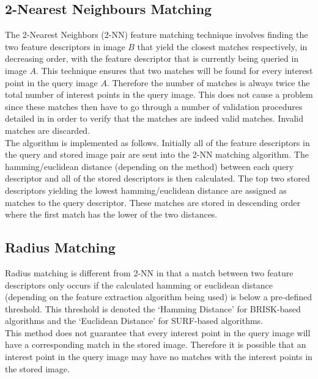 \documentclass{report}
\begin{document}
\subsection{2-Nearest Neighbours Matching}
\label{sec:knn}
The 2-Nearest Neighbors (2-NN) feature matching technique involves finding the two feature descriptors in image $B$ that yield the closest matches respectively, in decreasing order, with the feature descriptor that is currently being queried in image $A$. This technique ensures that two matches will be found for every interest point in the query image $A$. Therefore the number of matches is always twice the total number of interest points in the query image. This does not cause a problem since these matches then have to go through a number of validation procedures detailed in  in order to verify that the matches are indeed valid matches. Invalid matches are discarded. \\

The algorithm is implemented as follows. Initially all of the feature descriptors in the query and stored image pair are sent into the 2-NN matching algorithm. The hamming/euclidean distance (depending on the method) between each query descriptor and all of the stored descriptors is then calculated. The top two stored descriptors yielding the lowest hamming/euclidean distance are assigned as matches to the query descriptor. These matches are stored in descending order where the first match has the lower of the two distances.\\ 

\subsection{Radius Matching}
\label{sec:radius}
Radius matching is different from 2-NN in that a match between two feature descriptors only occurs if the calculated hamming or euclidean distance (depending on the feature extraction algorithm being used) is below a pre-defined threshold. This threshold is denoted the `Hamming Distance' for BRISK-based algorithms and the `Euclidean Distance' for SURF-based algorithms. \\

This method does not guarantee that every interest point in the query image will have a corresponding match in the stored image. Therefore it is possible that an interest point in the query image may have no matches with the interest points in the stored image.\\
\end{document}
